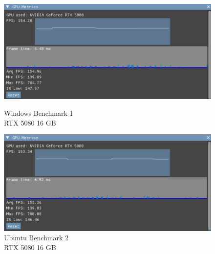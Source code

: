 \begin{figure}[ht]
    \centering
    \begin{minipage}[b]{0.48\textwidth}
        \centering
        \includegraphics[width=\textwidth]{images/5080-windows-1.png}
        \caption{Windows Benchmark 1 \\ \hspace*{6em} RTX 5080 16 GB}
        \label{fig:5080-windows-test-1}
    \end{minipage}
    \hfill
    \begin{minipage}[b]{0.48\textwidth}
        \centering
        \includegraphics[width=\textwidth]{images/5080-linux-1.png}
        \caption{Ubuntu Benchmark 2 \\ \hspace*{6em} RTX 5080 16 GB}
        \label{fig:5080-linux-test-1}
    \end{minipage}
\end{figure}

